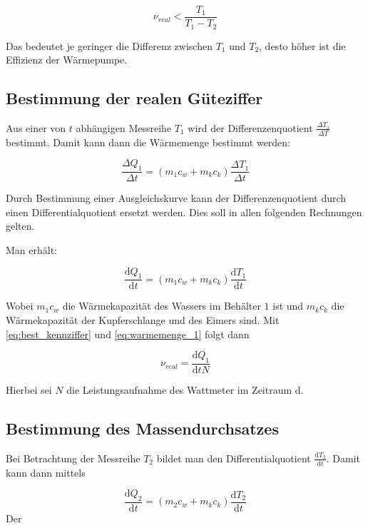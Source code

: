 \begin{equation*}
\nu_{real}<\frac{T_1}{T_1-T_2}
\end{equation*}

Das bedeutet je geringer die Differenz zwischen $T_1$ und $T_2$, 
desto höher ist die Effizienz der Wärmepumpe.

\subsection{Bestimmung der realen Güteziffer}
Aus einer von $t$ abhängigen Messreihe $T_1$ wird der Differenzenquotient $\frac{\Delta T_1}{\Delta T}$ bestimmt.
Damit kann dann die Wärmemenge bestimmt werden:

\begin{equation*}
\frac{\Delta Q_1}{\Delta t}=\left(m_1c_w+m_kc_k\right)\frac{\Delta T_1}{\Delta t}
\end{equation*}

Durch Bestimmung einer Ausgleichskurve kann der 
Differenzenquotient durch einen Differentialquotient
ersetzt werden.
Dies soll in allen folgenden Rechnungen gelten.

Man erhält:

\begin{equation}
\label{eq:warmemenge_1}
\frac{\mathup{d} Q_1}{\mathup{d} t}=\left(m_1c_w+m_kc_k\right)\frac{\mathup{d} T_1}{\mathup{d} t}
\end{equation}


Wobei $m_1c_w$ die Wärmekapazität des Wassers im Behälter $1$ ist und 
$m_kc_k$ die Wärmekapazität der Kupferschlange und des Eimers sind.
Mit \eqref{eq:best_kennziffer} und \eqref{eq:warmemenge_1} folgt dann

\begin{equation}
\label{eq:bestimmung_ziffer}
\nu_{real}=\frac{\mathup{d}Q_1}{\mathup{d}tN}
\end{equation}

Hierbei sei $N$ die Leistungsaufnahme des Wattmeter im Zeitraum $\mathup{d}$.

\subsection{Bestimmung des Massendurchsatzes}

Bei Betrachtung der Messreihe $T_2$ bildet man den Differentialquotient $\frac{\mathup{d}T_2}{\mathup{d}t}$.
Damit kann dann mittels

\begin{equation*}
\frac{\mathup{d} Q_2}{\mathup{d} t}=\left(m_2c_w+m_kc_k\right)\frac{\mathup{d} T_2}{\mathup{d} t}
\end{equation*}Der

